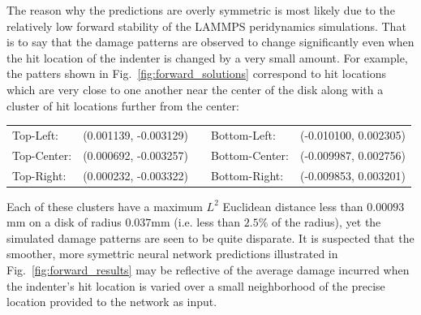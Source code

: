 The reason why the predictions are overly symmetric is most likely due to the relatively low forward stability of the LAMMPS peridynamics simulations.  That is to say that the damage patterns are observed to change significantly even when the hit location of the indenter is changed by a very small amount.  For example, the patters shown in Fig.~\ref{fig:forward_solutions} correspond to hit locations which are very close to one another near the center of the disk along with a cluster of hit locations further from the center:



\vspace{0.1in}
\noindent\begin{tabular}{@{}lcclc}
Top-Left:   &  (0.001139, -0.003129) & & Bottom-Left:   & (-0.010100, 0.002305) \\
Top-Center: &  (0.000692, -0.003257) & & Bottom-Center: & (-0.009987, 0.002756) \\
Top-Right:  &  (0.000232, -0.003322) & & Bottom-Right:  & (-0.009853, 0.003201) \\
\end{tabular}
\vspace{0.1in}




\noindent Each of these clusters have a maximum $L^2$ Euclidean distance less than $0.00093$mm on a disk of radius $0.037$mm (i.e. less than $2.5\%$ of the radius), yet the simulated damage patterns are seen to be quite disparate.  It is suspected that the smoother, more symettric neural network predictions illustrated in Fig.~\ref{fig:forward_results} may be reflective of the average damage incurred when the indenter's hit location is varied over a small neighborhood of the precise location provided to the network as input.




